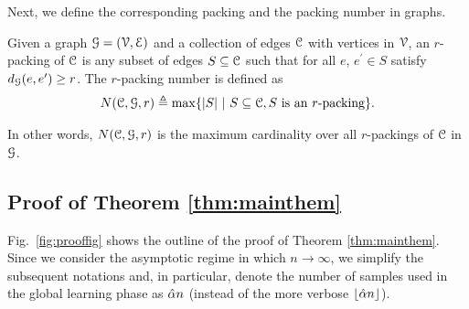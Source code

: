Next, we define the corresponding packing and the packing number in graphs.
\begin{definition}
	Given a graph $\mathcal{G}=(\mathcal{V},\mathcal{E})$ and a collection of edges $\mathcal{C}$ with vertices in $\mathcal{V}$, an $r$-packing of $\mathcal{C}$ is any subset of edges $S\subseteq\mathcal{C}$ such that 
	for all $e$, $e^{\prime}\in S$ satisfy $d_{\mathcal{G}}(e,e^{\prime})\geq r$. The $r$-packing number is defined as
	\begin{align}
		N(\mathcal{C},\mathcal{G},r)\triangleq\max \{|S| \ | \ S\subseteq\mathcal{C} , S \text{ is an }r\text{-packing}\}.
	\end{align}
\end{definition}
In other words,  $N(\mathcal{C},\mathcal{G},r)$ is the maximum cardinality over all  $r$-packings of $\mathcal{C}$ in $\mathcal{G}$.
\subsection{Proof of Theorem \ref{thm:mainthem}}
Fig.~\ref{fig:prooffig} shows the outline of the proof of Theorem \ref{thm:mainthem}. Since we consider the asymptotic regime in which  $n\rightarrow\infty$, we  simplify the  subsequent notations and, in particular, denote  the number of samples used in the global learning phase as  $\hat{\alpha} n$ (instead of the more verbose $\lfloor\hat{\alpha} n\rfloor$). %

